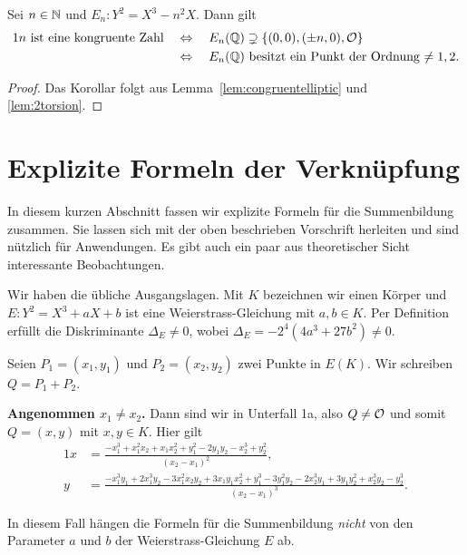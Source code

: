 \begin{korollar}
  \label{kor:congruentelliptic}
  Sei $n\in{\mathbb{N}}$ und $E_n : Y^2 = X^3-n^2 X$. Dann gilt
  \begin{alignat*}1
  n \text{ ist eine kongruente Zahl}\quad&\Leftrightarrow\quad  E_n(\IQ) \supsetneq
  \{(0,0),(\pm n,0),\cO\} \\
  &\Leftrightarrow \quad
  E_n(\IQ)\text{ besitzt ein Punkt der Ordnung $\not=1,2$.}
\end{alignat*}
\end{korollar}
\begin{proof}
  Das Korollar folgt aus Lemma~\ref{lem:congruentelliptic} und
  \ref{lem:2torsion}. 
\end{proof}

\section{Explizite Formeln der Verknüpfung}

In diesem kurzen Abschnitt fassen wir explizite Formeln für die
Summenbildung zusammen. Sie lassen sich mit der oben beschrieben
Vorschrift herleiten und sind nützlich für Anwendungen. Es gibt
auch ein paar aus theoretischer Sicht interessante Beobachtungen. 

Wir haben die übliche Ausgangslagen. Mit $K$ bezeichnen wir einen
Körper und $E: Y^2 = X^3+aX+b$ ist eine Weierstrass-Gleichung mit
$a,b\in K$. Per Definition erfüllt die Diskriminante $\Delta_E \not=
0$, wobei 
$\Delta_E=-2^4(4a^3+27b^2)\not=0$.

Seien $P_1 = (x_1,y_1)$ und $P_2 = (x_2,y_2)$ zwei Punkte in $E(K)$.
Wir schreiben $Q = P_1+P_2$. 

\bigskip
\textbf{Angenommen $x_1\not=x_2$.} Dann sind wir in Unterfall 1a, also
$Q\not={\mathcal O}$ und somit $Q = (x,y)$ mit $x,y\in K$. Hier gilt
\begin{alignat*}1
  x &= \frac{-x_1^3 + x_1^2x_2 + x_1x_2^2 + y_1^2 - 2y_1y_2 -x_2^3 +
    y_2^2}{(x_2-x_1)^2}, \\
  y &= \frac{-x_1^3 y_1 + 2x_1^3y_2 - 3x_1^2 x_2 y_2 + 3x_1y_1x_2^2 +
    y_1^3 - 3y_1^2y_2
     -2x_2^3y_1 + 3y_1 y_2^2 + x_2^3y_2 - y_2^3}{(x_2-x_1)^3}.
\end{alignat*}

In diesem Fall hängen die Formeln für die Summenbildung  \emph{nicht}
von den Parameter $a$ und $b$ der Weierstrass-Gleichung $E$ ab.  

